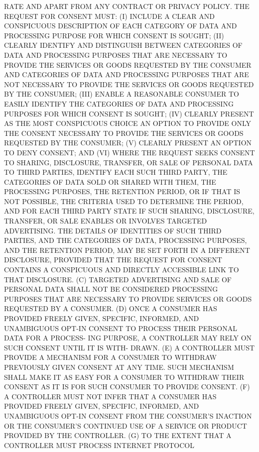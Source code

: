  RATE AND APART FROM ANY CONTRACT OR  PRIVACY  POLICY.  THE  REQUEST  FOR
 CONSENT MUST:
   (I)  INCLUDE  A  CLEAR AND CONSPICUOUS DESCRIPTION OF EACH CATEGORY OF
 DATA AND PROCESSING PURPOSE FOR WHICH CONSENT IS SOUGHT;
   (II) CLEARLY IDENTIFY AND DISTINGUISH BETWEEN CATEGORIES OF  DATA  AND
 PROCESSING  PURPOSES THAT ARE NECESSARY TO PROVIDE THE SERVICES OR GOODS
 REQUESTED BY THE CONSUMER AND CATEGORIES OF DATA AND PROCESSING PURPOSES
 THAT ARE NOT NECESSARY TO PROVIDE THE SERVICES OR GOODS REQUESTED BY THE
 CONSUMER;
   (III) ENABLE A REASONABLE CONSUMER TO EASILY IDENTIFY  THE  CATEGORIES
 OF DATA AND PROCESSING PURPOSES FOR WHICH CONSENT IS SOUGHT;
   (IV)  CLEARLY  PRESENT  AS  THE  MOST  CONSPICUOUS CHOICE AN OPTION TO
 PROVIDE ONLY THE CONSENT NECESSARY TO  PROVIDE  THE  SERVICES  OR  GOODS
 REQUESTED BY THE CONSUMER;
   (V) CLEARLY PRESENT AN OPTION TO DENY CONSENT; AND
   (VI) WHERE THE REQUEST SEEKS CONSENT TO SHARING, DISCLOSURE, TRANSFER,
 OR  SALE  OF  PERSONAL  DATA  TO THIRD PARTIES, IDENTIFY EACH SUCH THIRD
 PARTY, THE CATEGORIES OF DATA SOLD OR SHARED WITH THEM,  THE  PROCESSING
 PURPOSES, THE RETENTION PERIOD, OR IF THAT IS NOT POSSIBLE, THE CRITERIA
 USED  TO  DETERMINE  THE  PERIOD, AND FOR EACH THIRD PARTY STATE IF SUCH
 SHARING, DISCLOSURE, TRANSFER, OR  SALE  ENABLES  OR  INVOLVES  TARGETED
 ADVERTISING.  THE  DETAILS  OF IDENTITIES OF SUCH THIRD PARTIES, AND THE
 CATEGORIES OF DATA, PROCESSING PURPOSES, AND THE RETENTION  PERIOD,  MAY
 BE  SET  FORTH  IN A DIFFERENT DISCLOSURE, PROVIDED THAT THE REQUEST FOR
 CONSENT CONTAINS A CONSPICUOUS AND  DIRECTLY  ACCESSIBLE  LINK  TO  THAT
 DISCLOSURE.
   (C)  TARGETED  ADVERTISING  AND  SALE  OF  PERSONAL  DATA SHALL NOT BE
 CONSIDERED PROCESSING PURPOSES THAT ARE NECESSARY TO PROVIDE SERVICES OR
 GOODS REQUESTED BY A CONSUMER.
   (D) ONCE A CONSUMER HAS PROVIDED FREELY GIVEN, SPECIFIC, INFORMED, AND
 UNAMBIGUOUS OPT-IN CONSENT TO PROCESS THEIR PERSONAL DATA FOR A PROCESS-
 ING PURPOSE, A CONTROLLER MAY RELY ON SUCH CONSENT  UNTIL  IT  IS  WITH-
 DRAWN.
   (E)  A  CONTROLLER MUST PROVIDE A MECHANISM FOR A CONSUMER TO WITHDRAW
 PREVIOUSLY GIVEN CONSENT AT ANY TIME. SUCH MECHANISM SHALL  MAKE  IT  AS
 EASY FOR A CONSUMER TO WITHDRAW THEIR CONSENT AS IT IS FOR SUCH CONSUMER
 TO PROVIDE CONSENT.
   (F)  A  CONTROLLER  MUST NOT INFER THAT A CONSUMER HAS PROVIDED FREELY
 GIVEN, SPECIFIC, INFORMED,  AND  UNAMBIGUOUS  OPT-IN  CONSENT  FROM  THE
 CONSUMER'S  INACTION  OR  THE  CONSUMER'S  CONTINUED USE OF A SERVICE OR
 PRODUCT PROVIDED BY THE CONTROLLER.
   (G) TO THE EXTENT THAT A CONTROLLER  MUST  PROCESS  INTERNET  PROTOCOL
